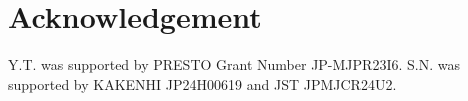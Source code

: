 \section*{Acknowledgement}
Y.T. was supported by PRESTO Grant Number JP-MJPR23I6. S.N. was supported by KAKENHI JP24H00619 and JST JPMJCR24U2.